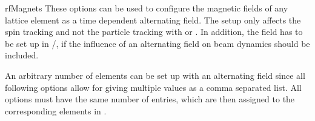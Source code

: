 \documentclass[a4paper]{scrartcl}
\begin{document}
\begin{configdocgroup}{rfMagnets}
  These options can be used to configure the magnetic fields of any lattice element as a
  time dependent alternating field. The setup only affects the spin tracking
  and not the particle tracking with \ele or \madx. In addition, the field has to be set
  up in \ele/\madx, if the influence of an alternating field on beam dynamics should be
  included.

  An arbitrary number of elements can be set up with an alternating field since all
  following options allow for giving multiple values as a comma separated list. All
  options must have the same number of entries, which are then assigned to the
  corresponding elements in .\\[1mm]




\end{configdocgroup}



\end{document}
